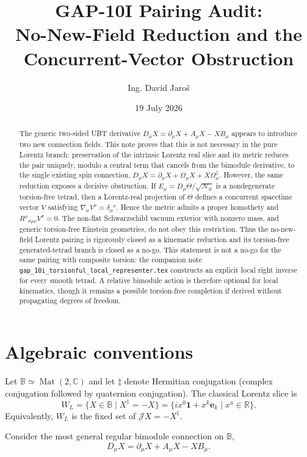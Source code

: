 \documentclass[12pt,a4paper]{article}
\title{GAP-10I Pairing Audit:\\No-New-Field Reduction and the Concurrent-Vector Obstruction}
\author{Ing. David Jaro\v{s}}
\date{19 July 2026}
\theoremstyle{remark}\newtheorem{remark}[definition]{Remark}
\newcommand{\B}{\mathbb B}
\begin{document}
\maketitle
\UBTProvenanceNotice

\begin{abstract}
The generic two-sided UBT derivative
$D_\mu X=\partial_\mu X+A_\mu X-XB_\mu$ appears to introduce two new
connection fields.  This note proves that this is not necessary in the pure
Lorentz branch: preservation of the intrinsic Lorentz real slice and its
metric reduces the pair uniquely, modulo a central term that cancels from the
bimodule derivative, to the single existing spin connection,
$D_\mu X=\partial_\mu X+\Omega_\mu X+X\Omega_\mu^\ddagger$.
However, the same reduction exposes a decisive obstruction.  If
$E_\mu=D_\mu\Theta/\sqrt{\mathcal N_0}$ is a nondegenerate torsion-free tetrad,
then a Lorentz-real projection of $\Theta$ defines a concurrent spacetime
vector $V$ satisfying $\nabla_\mu V^\nu=\delta_\mu{}^\nu$.  Hence the metric
admits a proper homothety and $R^\rho{}_{\sigma\mu\nu}V^\sigma=0$.
The non-flat Schwarzschild vacuum exterior with nonzero mass, and generic
torsion-free Einstein geometries, do not obey this restriction.  Thus the
no-new-field Lorentz pairing is rigorously closed as a kinematic reduction and
its torsion-free generated-tetrad branch is closed as a no-go.  This statement
is not a no-go for the same pairing with composite torsion: the companion note
\texttt{gap\_10i\_torsionful\_local\_representer.tex} constructs an explicit
local right inverse for every smooth tetrad.  A relative bimodule action is
therefore optional for local kinematics, though it remains a possible
torsion-free completion if derived without propagating degrees of freedom.
\end{abstract}

\section{Algebraic conventions}
Let $\B\simeq\operatorname{Mat}(2,\mathbb C)$ and let $\ddagger$ denote
Hermitian conjugation (complex conjugation followed by quaternion
conjugation).  The classical Lorentz slice is
\begin{equation}
 W_L=\{X\in\B\mid X^\ddagger=-X\}
 =\{i x^0\mathbf1+x^k\mathbf e_k\mid x^a\in\mathbb R\}.
\end{equation}
Equivalently, $W_L$ is the fixed set of
$\mathcal JX=-X^\ddagger$.

Consider the most general regular bimodule connection on $\B$,
\begin{equation}
 D_\mu X=\partial_\mu X+A_\mu X-XB_\mu.
 \label{eq:general-pair}
\end{equation}
\end{document}
